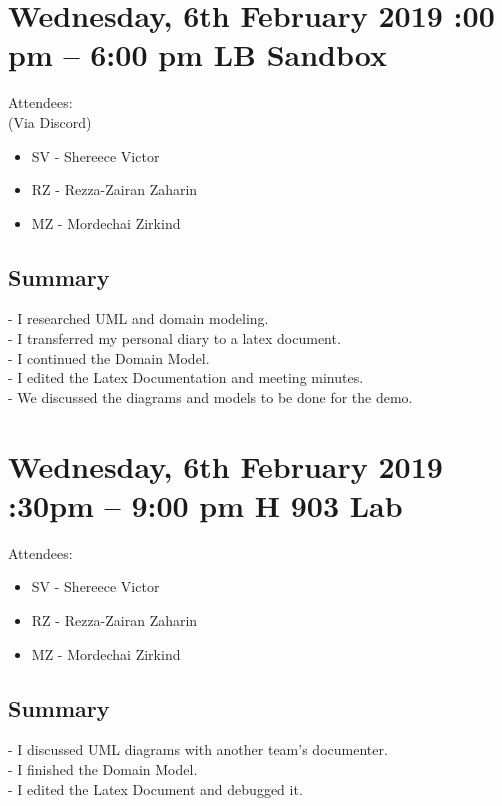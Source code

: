 \documentclass[12pt]{article}
\begin{document}
\section{Wednesday, 6th February 2019 :00 pm – 6:00 pm \textbar LB Sandbox}

Attendees:\\ 
(Via Discord) \\
\begin{itemize}
	\item SV - Shereece Victor
	\item RZ - Rezza-Zairan Zaharin
	\item MZ - Mordechai Zirkind
\end{itemize}
\subsection{Summary}
-	I researched UML and domain modeling.\\
-	I transferred my personal diary to a latex document.\\
-	I continued the Domain Model.\\
-	I edited the Latex Documentation and meeting minutes.\\
-	We discussed the diagrams and models to be done for the demo.\\ 
 

\section{Wednesday, 6th February 2019 :30pm – 9:00 pm \textbar H 903 Lab}

Attendees: 
\begin{itemize}
	\item SV - Shereece Victor
	\item RZ - Rezza-Zairan Zaharin
	\item MZ - Mordechai Zirkind
\end{itemize}

 \subsection{Summary}
-	I discussed UML diagrams with another team’s documenter.\\
-	I finished the Domain Model.\\
-	I edited the Latex Document and debugged it.\\
\end{document}
